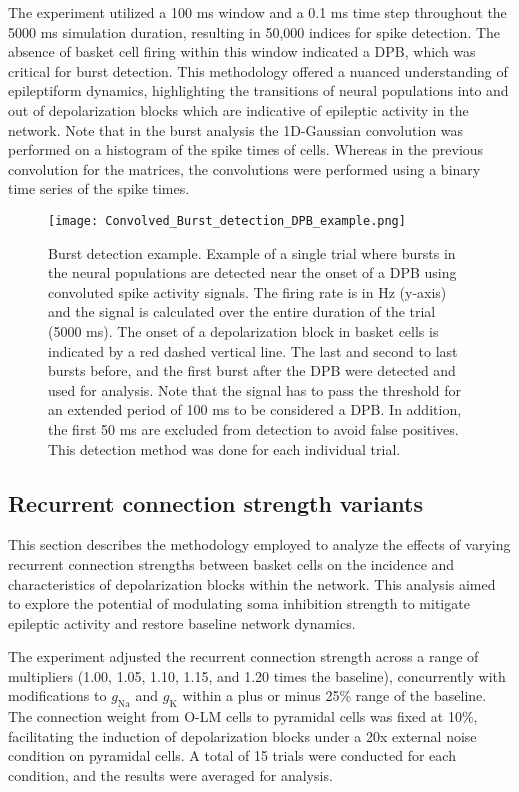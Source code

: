 \noindent The experiment utilized a 100 ms window and a 0.1 ms time step throughout the 5000 ms simulation duration, resulting in 50,000 indices for spike detection.
The absence of basket cell firing within this window indicated a DPB, which was critical for burst detection.
This methodology offered a nuanced understanding of epileptiform dynamics, highlighting the transitions of neural populations into and out of depolarization blocks which are indicative of epileptic activity in the network.
Note that in the burst analysis the 1D-Gaussian convolution was performed on a histogram of the spike times of cells. Whereas in the previous convolution for the matrices, the convolutions were performed using a binary time series of the spike times.

\begin{figure}[htbp]
    \centering
    \texttt{[image: Convolved\_Burst\_detection\_DPB\_example.png]}
    \caption[Burst detection example]{Burst detection example. Example of a single trial where bursts in the neural populations are detected near the onset of a DPB using convoluted spike activity signals. The firing rate is in Hz (y-axis) and the signal is calculated over the entire duration of the trial (5000 ms).
        The onset of a depolarization block in basket cells is indicated by a red dashed vertical line. The last and second to last bursts before, and the first burst after the DPB were detected and used for analysis.
        Note that the signal has to pass the threshold for an extended period of 100 ms to be considered a DPB\@.
        In addition, the first 50 ms are excluded from detection to avoid false positives. This detection method was done for each individual trial.}\label{fig:example_burst_detection}
\end{figure}
\pagebreak

\subsection{Recurrent connection strength variants}
This section describes the methodology employed to analyze the effects of
varying recurrent connection strengths between basket cells on the incidence
and characteristics of depolarization blocks within the network. This analysis
aimed to explore the potential of modulating soma inhibition strength to
mitigate epileptic activity and restore baseline network dynamics.

The experiment adjusted the recurrent connection strength across a range of
multipliers (1.00, 1.05, 1.10, 1.15, and 1.20 times the baseline), concurrently
with modifications to \(g_{\text{Na}}\) and \(g_{\text{K}}\) within a plus or
minus 25\% range of the baseline. The connection weight from O-LM cells to
pyramidal cells was fixed at 10\%, facilitating the induction of depolarization
blocks under a 20x external noise condition on pyramidal cells. A total of 15
trials were conducted for each condition, and the results were averaged for
analysis.

